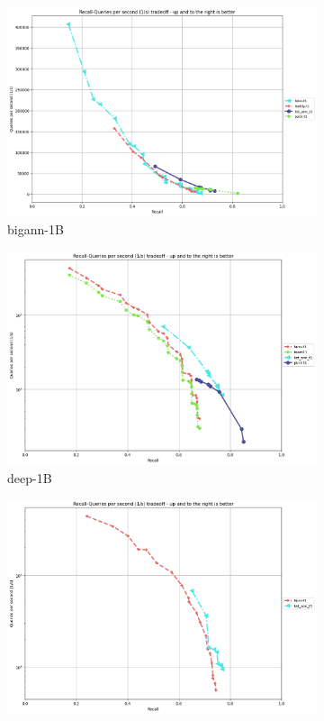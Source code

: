 \iffalse 

\begin{figure}[ht]
  \begin{subfigure}{10cm}
    \centering
    \includegraphics[width=\linewidth]{../t1_t2/results/T1/neurips21/bigann-1B.png}
      \caption{bigann-1B}
  \end{subfigure}
  \begin{subfigure}{10cm}
    \centering
    \includegraphics[width=\linewidth]{../t1_t2/results/T1/neurips21/deep-1B.png}
    \caption{deep-1B}
  \end{subfigure}
  \begin{subfigure}{10cm}
    \centering
    \includegraphics[width=\linewidth]{../t1_t2/results/T1/neurips21/msspacev-1B.png}

\end{subfigure}
\end{figure}
